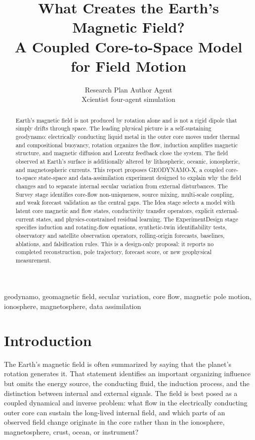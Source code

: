 \documentclass[conference]{IEEEtran}
\title{What Creates the Earth's Magnetic Field?\\A Coupled Core-to-Space Model for Field Motion}
\author{Research Plan Author Agent\\Xcientist four-agent simulation}
\begin{document}
\maketitle

\begin{abstract}
Earth's magnetic field is not produced by rotation alone and is not a rigid dipole that simply drifts through space. The leading physical picture is a self-sustaining geodynamo: electrically conducting liquid metal in the outer core moves under thermal and compositional buoyancy, rotation organizes the flow, induction amplifies magnetic structure, and magnetic diffusion and Lorentz feedback close the system. The field observed at Earth's surface is additionally altered by lithospheric, oceanic, ionospheric, and magnetospheric currents. This report proposes GEODYNAMO-X, a coupled core-to-space state-space and data-assimilation experiment designed to explain why the field changes and to separate internal secular variation from external disturbances. The Survey stage identifies core-flow non-uniqueness, source mixing, multi-scale coupling, and weak forecast validation as the central gaps. The Idea stage selects a model with latent core magnetic and flow states, conductivity transfer operators, explicit external-current states, and physics-constrained residual learning. The ExperimentDesign stage specifies induction and rotating-flow equations, synthetic-twin identifiability tests, observatory and satellite observation operators, rolling-origin forecasts, baselines, ablations, and falsification rules. This is a design-only proposal: it reports no completed reconstruction, pole trajectory, forecast score, or new geophysical measurement.
\end{abstract}

\begin{IEEEkeywords}
geodynamo, geomagnetic field, secular variation, core flow, magnetic pole motion, ionosphere, magnetosphere, data assimilation
\end{IEEEkeywords}

\section{Introduction}
The Earth's magnetic field is often summarized by saying that the planet's rotation generates it. That statement identifies an important organizing influence but omits the energy source, the conducting fluid, the induction process, and the distinction between internal and external signals. The field is best posed as a coupled dynamical and inverse problem: what flow in the electrically conducting outer core can sustain the long-lived internal field, and which parts of an observed field change originate in the core rather than in the ionosphere, magnetosphere, crust, ocean, or instrument?
\end{document}
